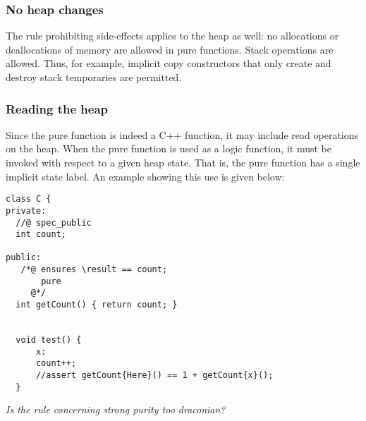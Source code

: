 \subsubsection{No heap changes}
The rule prohibiting side-effects applies to the heap as well:
no allocations or deallocations of memory are allowed in pure functions.
Stack operations are allowed. Thus, for example,
 implicit copy constructors that 
only create and destroy stack temporaries are permitted.

\subsubsection*{Reading the heap}
Since the pure function is indeed a C++ function, it may include read operations on the heap. When the pure function is used as a logic function,
it must be invoked with respect to a given heap state. 
That is, the pure function has a single implicit state label.
An example showing this use is given below:
\begin{lstlisting}
class C {
private:
  //@ spec_public
  int count;

public:
   /*@ ensures \result == count;
       pure
     @*/   
  int getCount() { return count; }
  
  
  void test() {
      x:
      count++;
      //assert getCount{Here}() == 1 + getCount{x}();
  }

\end{lstlisting}

	\emph{Is the rule concerning strong purity too draconian?}
